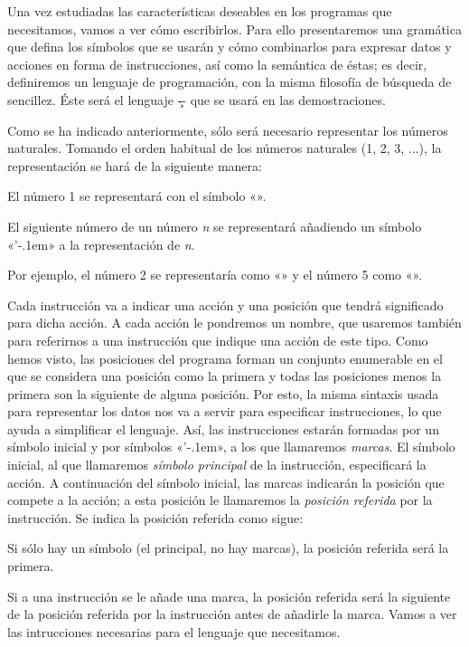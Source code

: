 %
Una vez estudiadas las características deseables en los programas que necesitamos, vamos a ver cómo
escribirlos. Para ello presentaremos una gramática que defina los símbolos que se usarán y cómo
combinarlos para expresar datos y acciones en forma de instrucciones, así como la semántica de
éstas; es decir, definiremos un lenguaje de programación, con la misma filosofía de búsqueda de
sencillez. Éste será el lenguaje \c-- que se usará en las demostraciones.

%
Como se ha indicado anteriormente, sólo será necesario representar los números
naturales. Tomando el orden habitual de los números naturales (1, 2, 3, ...), la representación
se hará de la siguiente manera:

\listanormal
El número 1 se representará con el símbolo «{}».

El siguiente número de un número {\it n} se representará añadiendo un símbolo «{\fcodej’\kern-.1em}» a la
representación de {\it n}.

\finlista
Por ejemplo, el número 2 se representaría como «» y el número 5 como «».

%
Cada instrucción va a indicar una acción y una posición que tendrá significado para dicha acción. A
cada acción le pondremos un nombre, que usaremos también para referirnos a una instrucción que
indique una acción de este tipo. Como hemos visto, las posiciones del programa forman un conjunto
enumerable en el que se considera una posición como la primera y todas las posiciones menos la
primera son la siguiente de alguna posición. Por esto, la misma sintaxis usada para representar los
datos nos va a servir para especificar instrucciones, lo que ayuda a simplificar el lenguaje. Así,
las instrucciones estarán formadas por un símbolo inicial y por símbolos «{\fcodej’\kern-.1em}», a
los que llamaremos {\it marcas}. El símbolo inicial, al que llamaremos {\it símbolo principal} de la
instrucción, especificará la acción. A continuación del símbolo inicial, las marcas indicarán la
posición que compete a la acción; a esta posición le llamaremos la {\it posición referida} por la
instrucción. Se indica la posición referida como sigue:

\listanormal
Si sólo hay un símbolo (el principal, no hay marcas), la posición referida será la primera.

Si a una instrucción se le añade una marca, la posición referida será la siguiente de la posición
referida por la instrucción antes de añadirle la marca.
\finlista
Vamos a ver las intrucciones necesarias para el lenguaje que necesitamos.


